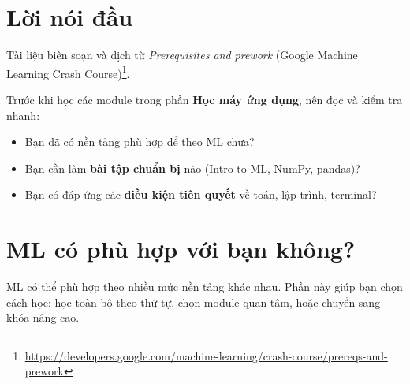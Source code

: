 \documentclass[12pt,a4paper]{article}
\begin{document}

\newpage
\tableofcontents
\newpage

\section*{Lời nói đầu}

\begin{ynghia}[title={Nguồn và cách đọc}]
Tài liệu biên soạn và dịch từ \emph{Prerequisites and prework} (Google Machine Learning Crash Course)\footnote{\url{https://developers.google.com/machine-learning/crash-course/prereqs-and-prework}}.
\end{ynghia}

\begin{luuy}[title={target của tài liệu này}]
Trước khi học các module trong phần \textbf{Học máy ứng dụng}, nên đọc và kiểm tra nhanh:
\begin{itemize}
  \item Bạn đã có nền tảng phù hợp để theo ML chưa?
  \item Bạn cần làm \textbf{bài tập chuẩn bị} nào (Intro to ML, NumPy, pandas)?
  \item Bạn có đáp ứng các \textbf{điều kiện tiên quyết} về toán, lập trình, terminal?
\end{itemize}
\end{luuy}

\newpage

\section{ML có phù hợp với bạn không?}

\begin{dongco}[title={Chọn lộ trình phù hợp}]
ML có thể phù hợp theo nhiều mức nền tảng khác nhau. Phần này giúp bạn chọn cách học: học toàn bộ theo thứ tự, chọn module quan tâm, hoặc chuyển sang khóa nâng cao.
\end{dongco}
\end{document}
